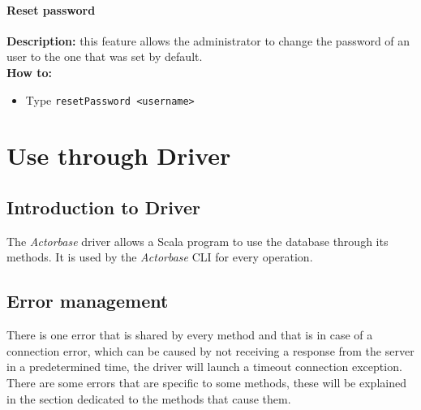 \documentclass{scalatekids-article}
\begin{document}
\paragraph{Reset password}
\label{sec:resetpassword}
\textbf{Description:} this feature allows the administrator to change the password of an user to the one that was set by default.\\
\textbf{How to:} 
\begin{itemize}
	\item Type \texttt{resetPassword <username>}
\end{itemize}

\section{Use through Driver}

\subsection{Introduction to Driver}
The \textit{Actorbase} driver allows a Scala program to use the database through its methods. It is used
by the \textit{Actorbase} CLI for every operation.

\subsection{Error management}

There is one error that is shared by every method and that is in case of a
connection error, which can be caused by not receiving a response from the
server in a predetermined time, the driver will launch a timeout connection exception.
There are some errors that are specific to some methods, these will be explained
in the section dedicated to the methods that cause them.

\listoftables

\listoffigures
\end{document}
